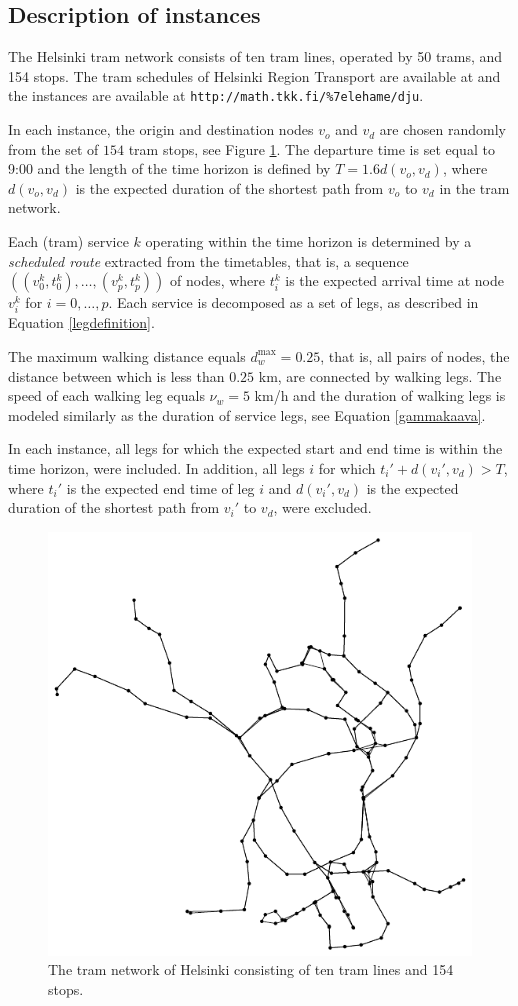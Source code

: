 \documentclass[dissertation,draft*]{aaltoseries}
\begin{document}
\subsection{Description of instances}
\label{reallife}
The Helsinki tram network consists of ten tram lines, operated by 50 trams, and 154 stops. 
The tram schedules of Helsinki Region Transport are available at \cite{reittiopas} and
the instances are available at \verb=http://math.tkk.fi/%7elehame/dju=.

In each instance, the origin and destination nodes $v_o$ and $v_d$ are chosen randomly from the 
set of $154$ tram stops, see Figure \ref{verkot01}. The departure time is set equal to 9:00 and the length of the time horizon
is defined by $T = 1.6 d(v_o,v_d)$, where $d(v_o,v_d)$ is the expected duration of the shortest path from $v_o$ to $v_d$ 
in the tram network.

Each (tram) service $k$ operating within the time horizon is determined by a \emph{scheduled route} extracted from the timetables, that is, 
a sequence $((v_0^k,t_0^k),\ldots,(v_p^k,t_p^k))$ of 
nodes, where $t_i^k$ is the expected arrival time at node $v_i^k$ 
for $i=0,\ldots,p$. Each service is
decomposed as a set of legs, as described in Equation \eqref{legdefinition}.

The maximum walking distance equals $d_w^{\max} = 0.25$, that is, all pairs of nodes, the distance 
between which is less than $0.25$ km, are connected by walking legs. The speed of each walking leg equals
$\nu_w=5$ km/h and the duration of walking legs is modeled similarly as the duration of service legs, see Equation \eqref{gammakaava}.

In each instance, all legs for which the expected start and end time is within the time horizon, were included. 
In addition, all legs $i$ for which $t_i' + d(v_i',v_d) > T$, where $t_i'$ is the expected end time of leg $i$ and
$d(v_i',v_d)$ is the expected duration of the shortest path from $v_i'$ to $v_d$, were excluded.

\begin{figure}[ht]
\begin{center}
\includegraphics[width=0.5\columnwidth]{verkot01a}
\end{center}
\caption{The tram network of Helsinki consisting of ten tram lines and 154 stops. 
}
\label{verkot01}
\end{figure}
\end{document}
